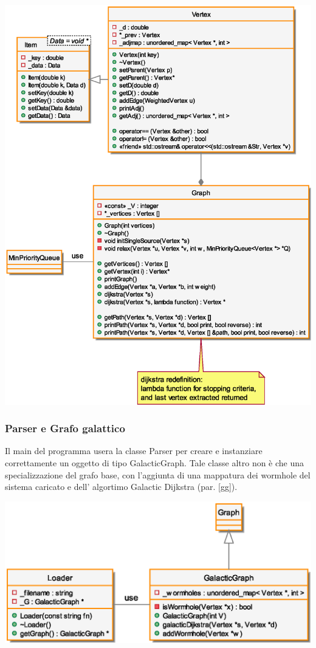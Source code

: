 \begin{center}
\includegraphics[scale=0.7]{tesina_tex/spacegraph/2img/g.eps}
\end{center}

\newpage
\subsubsection{Parser e Grafo galattico}
\indent Il main del programma usera la classe Parser per creare e instanziare correttamente un oggetto di
tipo GalacticGraph. Tale classe altro non \`e che una specializzazione del grafo base, con l'aggiunta
di una mappatura dei wormhole del sistema caricato e dell' algortimo Galactic Dijkstra (par. \ref{gg}).
\begin{center}
\includegraphics[scale=0.9]{tesina_tex/spacegraph/2img/gg.eps}
\end{center}